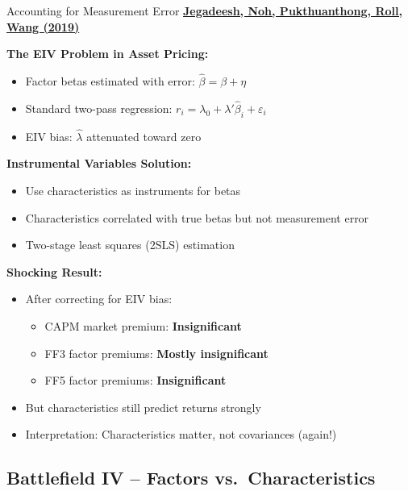 \documentclass{beamer}
\begin{document}
\begin{frame}{Accounting for Measurement Error}
    \textbf{\textcolor{blue}{\href{https://doi.org/10.1016/j.jfineco.2019.02.010}{Jegadeesh, Noh, Pukthuanthong, Roll, Wang (2019)}}}
    
    
    \textbf{The EIV Problem in Asset Pricing:}
    \begin{itemize}
        \item Factor betas estimated with error: $\hat{\beta} = \beta + \eta$
        \item Standard two-pass regression: $r_i = \lambda_0 + \lambda' \hat{\beta}_i + \varepsilon_i$
        \item EIV bias: $\hat{\lambda}$ attenuated toward zero
    \end{itemize}
    
    
    \textbf{Instrumental Variables Solution:}
    \begin{itemize}
        \item Use characteristics as instruments for betas
        \item Characteristics correlated with true betas but not measurement error
        \item Two-stage least squares (2SLS) estimation
    \end{itemize}
    
    
    \textbf{Shocking Result:}
    \begin{itemize}
        \item After correcting for EIV bias:
        \begin{itemize}
            \item CAPM market premium: \textbf{Insignificant}
            \item FF3 factor premiums: \textbf{Mostly insignificant}
            \item FF5 factor premiums: \textbf{Insignificant}
        \end{itemize}
        \item But characteristics still predict returns strongly
        \item Interpretation: Characteristics matter, not covariances (again!)
    \end{itemize}
\end{frame}

\subsection{Battlefield IV -- Factors vs.\ Characteristics}
\end{document}
